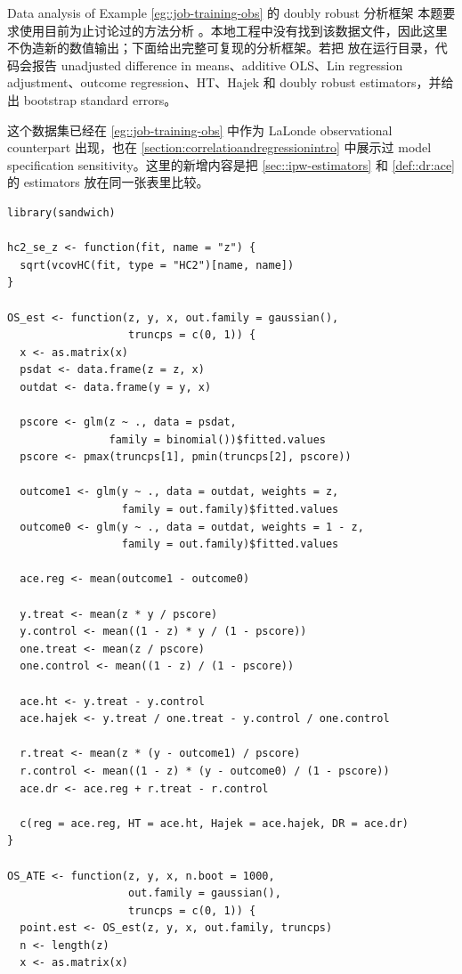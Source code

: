 \begin{exercisesolution}{Data analysis of Example \cref{eg::job-training-obs}}{ 的 doubly robust 分析框架}
本题要求使用目前为止讨论过的方法分析 。本地工程中没有找到该数据文件，因此这里不伪造新的数值输出；下面给出完整可复现的分析框架。若把  放在运行目录，代码会报告 unadjusted difference in means、additive OLS、Lin regression adjustment、outcome regression、HT、Hajek 和 doubly robust estimators，并给出 bootstrap standard errors。

这个数据集已经在 \cref{eg::job-training-obs} 中作为 LaLonde observational counterpart 出现，也在 \cref{section:correlatioandregressionintro} 中展示过 model specification sensitivity。这里的新增内容是把 \cref{sec::ipw-estimators} 和 \cref{def::dr:ace} 的 estimators 放在同一张表里比较。

\begin{lstlisting}
library(sandwich)

hc2_se_z <- function(fit, name = "z") {
  sqrt(vcovHC(fit, type = "HC2")[name, name])
}

OS_est <- function(z, y, x, out.family = gaussian(),
                   truncps = c(0, 1)) {
  x <- as.matrix(x)
  psdat <- data.frame(z = z, x)
  outdat <- data.frame(y = y, x)

  pscore <- glm(z ~ ., data = psdat,
                family = binomial())$fitted.values
  pscore <- pmax(truncps[1], pmin(truncps[2], pscore))

  outcome1 <- glm(y ~ ., data = outdat, weights = z,
                  family = out.family)$fitted.values
  outcome0 <- glm(y ~ ., data = outdat, weights = 1 - z,
                  family = out.family)$fitted.values

  ace.reg <- mean(outcome1 - outcome0)

  y.treat <- mean(z * y / pscore)
  y.control <- mean((1 - z) * y / (1 - pscore))
  one.treat <- mean(z / pscore)
  one.control <- mean((1 - z) / (1 - pscore))

  ace.ht <- y.treat - y.control
  ace.hajek <- y.treat / one.treat - y.control / one.control

  r.treat <- mean(z * (y - outcome1) / pscore)
  r.control <- mean((1 - z) * (y - outcome0) / (1 - pscore))
  ace.dr <- ace.reg + r.treat - r.control

  c(reg = ace.reg, HT = ace.ht, Hajek = ace.hajek, DR = ace.dr)
}

OS_ATE <- function(z, y, x, n.boot = 1000,
                   out.family = gaussian(),
                   truncps = c(0, 1)) {
  point.est <- OS_est(z, y, x, out.family, truncps)
  n <- length(z)
  x <- as.matrix(x)


\end{lstlisting}
\end{exercisesolution}
